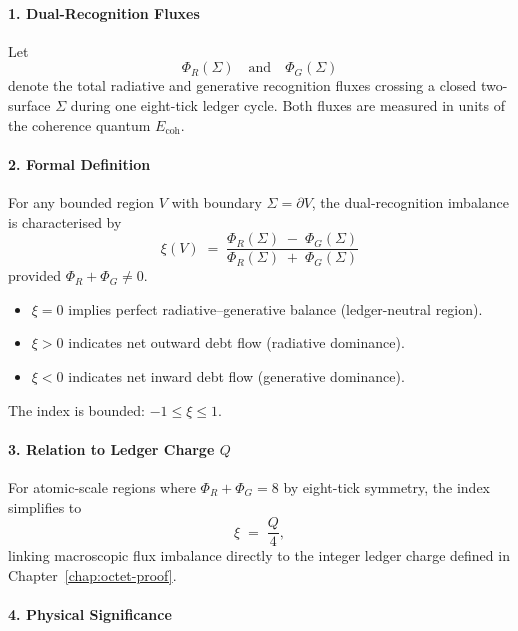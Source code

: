 \documentclass[11pt,oneside]{book}
\begin{document}
\paragraph*{1. Dual-Recognition Fluxes}

Let
\[
   \Phi_R(\Sigma) \quad\text{and}\quad \Phi_G(\Sigma)
\]
denote the total radiative and generative recognition fluxes crossing a
closed two-surface \(\Sigma\) during one eight-tick ledger cycle.
Both fluxes are measured in units of the coherence quantum
\(E_{\text{coh}}\).

\paragraph*{2. Formal Definition}

\begin{definition}
For any bounded region \(V\) with boundary \(\Sigma=\partial V\),
the dual-recognition imbalance is characterised by
\[
   \boxed{\;
   \xi(V)
   \;=\;
   \frac{\displaystyle \Phi_R(\Sigma) \;-\; \Phi_G(\Sigma)}
        {\displaystyle \Phi_R(\Sigma) \;+\; \Phi_G(\Sigma)}
   \;}
\]
provided \(\Phi_R+\Phi_G\neq0\).
\end{definition}

\begin{itemize}
\item \(\xi=0\) implies perfect radiative–generative balance
      (ledger-neutral region).
\item \(\xi>0\) indicates net outward debt flow
      (radiative dominance).
\item \(\xi<0\) indicates net inward debt flow
      (generative dominance).
\end{itemize}

The index is bounded:
\(-1 \le \xi \le 1\).

\paragraph*{3. Relation to Ledger Charge \(Q\)}

For atomic‐scale regions where \(\Phi_R+\Phi_G = 8\) by eight-tick
symmetry, the index simplifies to
\[
   \xi \;=\; \frac{Q}{4},
\]
linking macroscopic flux imbalance directly to the integer ledger charge
defined in Chapter~\ref{chap:octet-proof}.

\paragraph*{4. Physical Significance}
\end{document}
